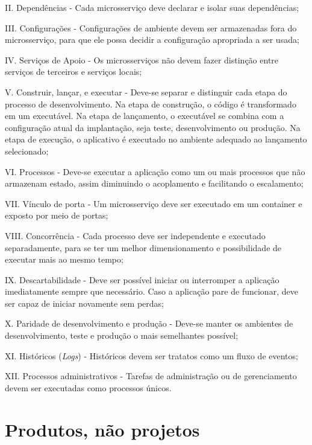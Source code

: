 II. Dependências - Cada microsserviço deve declarar e isolar suas dependências;

III. Configurações - Configurações de ambiente devem ser armazenadas fora do microsserviço, para que ele possa decidir a configuração apropriada a ser usada;

IV. Serviços de Apoio - Os microsserviços não devem fazer distinção entre serviços de terceiros e serviços locais;

V. Construir, lançar, e executar - Deve-se separar e distinguir cada etapa do processo de desenvolvimento. Na etapa de construção, o código é transformado em um executável. Na etapa de lançamento, o executável se combina com a configuração atual da implantação, seja teste, desenvolvimento ou produção. Na etapa de execução, o aplicativo é executado no ambiente adequado ao lançamento selecionado;

VI. Processos - Deve-se executar a aplicação como um ou mais processos que não armazenam estado, assim diminuindo o acoplamento e facilitando o escalamento;

VII. Vínculo de porta - Um microsserviço deve ser executado em um container e exposto por meio de portas;

VIII. Concorrência - Cada processo deve ser independente e executado separadamente, para se ter um melhor dimensionamento e possibilidade de executar mais ao mesmo tempo;

IX. Descartabilidade - Deve ser possível iniciar ou interromper a aplicação imediatamente sempre que necessário. Caso a aplicação pare de funcionar, deve ser capaz de iniciar novamente sem perdas;

X. Paridade de desenvolvimento e produção - Deve-se manter os ambientes de desenvolvimento, teste e produção o mais semelhantes possível;

XI. Históricos (\emph{Logs}) - Históricos devem ser tratatos como um fluxo de eventos;

XII. Processos administrativos - Tarefas de administração ou de gerenciamento devem ser executadas como processos únicos.

\section{Produtos, não projetos}


